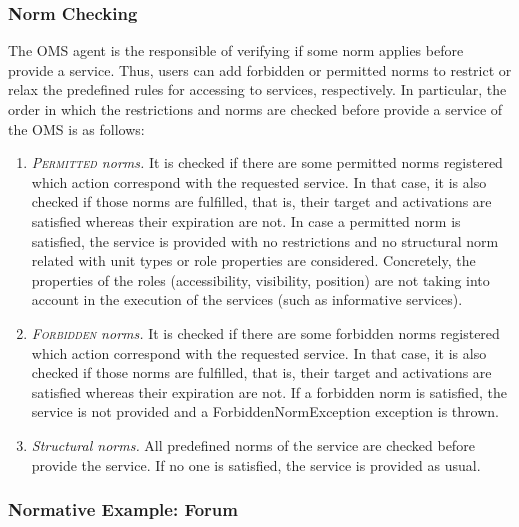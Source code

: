 \subsubsection{Norm Checking}

The OMS agent is the responsible of verifying if some norm applies before provide a service. Thus, users can add forbidden or permitted norms to restrict or relax the predefined rules for accessing to services,  respectively. In particular, the order in which the restrictions and norms are checked before provide a service of the OMS is as follows: 
\begin{enumerate}
\item \textit{\textsc{Permitted} norms.} It is checked if there are some permitted norms registered which action correspond with the requested service. In that case, it is also checked if those norms are fulfilled, that is, their target and activations are satisfied whereas their expiration are not. In case a permitted norm is satisfied, the service is provided with no restrictions and  no structural norm related with unit types or role properties are considered. Concretely, the properties of the roles (accessibility, visibility, position) are not taking into account in the execution of the services (such as informative services).

\item \textit{\textsc{Forbidden} norms.}  It is checked if there are some forbidden norms registered which action correspond with the requested service. In that case, it is also checked if those norms are fulfilled, that is, their target and activations are satisfied whereas their expiration are not. If a forbidden norm is satisfied, the service is not provided and a ForbiddenNormException exception is thrown. 

\item \textit{Structural norms.} All predefined norms of the service are checked before provide the service. If no one is satisfied, the service is provided as usual.
\end{enumerate}

\subsubsection{Normative Example: Forum}


